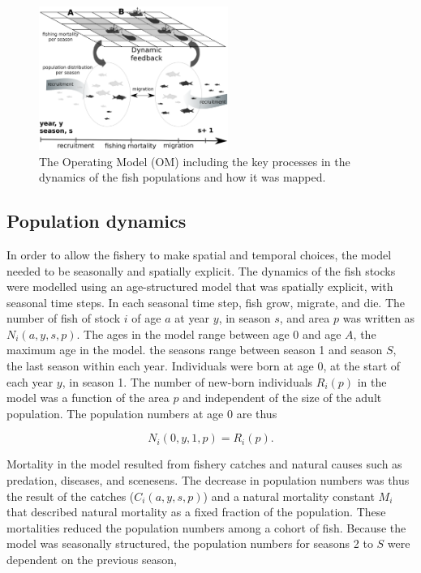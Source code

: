 \documentclass[12pt,oneline,a4paper,numbib]{ouparticle}
\numberwithin{equation}{subsection} %
\begin{document}
\begin{figure}[!h]
\centering
\includegraphics[width=0.55\textwidth]{Figures/Areadynamics.eps} 
\caption{The Operating Model (OM) including the key processes in the dynamics of the fish populations and how it was mapped.}
\label{fig:stockdyn}
\end{figure}

\subsection{Population dynamics}
\label{sec2.1}

In order to allow the fishery to make spatial and temporal choices, the model needed to be seasonally and spatially explicit. The dynamics of the fish stocks were modelled using an age-structured model that was spatially explicit, with seasonal time steps. In each seasonal time step, fish grow, migrate, and die. The number of fish of stock $i$ of age $a$ at year $y$, in season $s$, and area $p$ was written as $N_i (a, y, s, p)$.  The ages in the model range between age 0 and age $A$, the maximum age in the model. the seasons range between season 1 and season $S$, the last season within each year. Individuals were born at age 0, at the start of each year $y$, in season 1. The number of new-born individuals $R_i (p)$ in the model was a function of the area $p$ and independent of the size of the adult population. The population numbers at age 0 are thus
 
\begin{equation}
N_i (0, y, 1, p) = R_i (p).
\end{equation}


Mortality in the model resulted from fishery catches and natural causes such as predation, diseases, and scenesens. The decrease in population numbers was thus the result of the catches ($C_i (a, y, s, p)$) and a natural mortality constant $M_i$ that described natural mortality as a fixed fraction of the population. These mortalities reduced the population numbers among a cohort of fish. Because the model was seasonally structured, the population numbers for seasons 2 to $S$ were dependent on the previous season,
\end{document}
